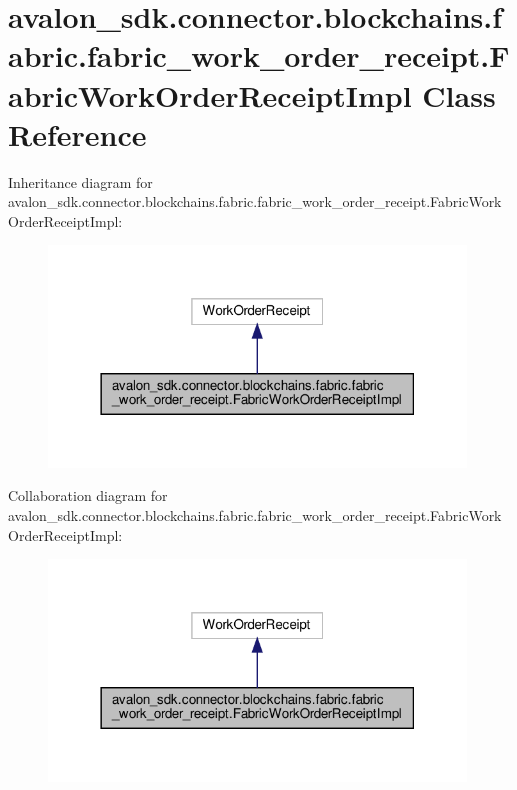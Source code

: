 \hypertarget{classavalon__sdk_1_1connector_1_1blockchains_1_1fabric_1_1fabric__work__order__receipt_1_1FabricWorkOrderReceiptImpl}{}\section{avalon\+\_\+sdk.\+connector.\+blockchains.\+fabric.\+fabric\+\_\+work\+\_\+order\+\_\+receipt.\+Fabric\+Work\+Order\+Receipt\+Impl Class Reference}
\label{classavalon__sdk_1_1connector_1_1blockchains_1_1fabric_1_1fabric__work__order__receipt_1_1FabricWorkOrderReceiptImpl}


Inheritance diagram for avalon\+\_\+sdk.\+connector.\+blockchains.\+fabric.\+fabric\+\_\+work\+\_\+order\+\_\+receipt.\+Fabric\+Work\+Order\+Receipt\+Impl\+:
\nopagebreak
\begin{figure}[H]
\begin{center}
\leavevmode
\includegraphics[width=314pt]{classavalon__sdk_1_1connector_1_1blockchains_1_1fabric_1_1fabric__work__order__receipt_1_1Fabric4ae3a09fa88125b899609c0d4382bf8a}
\end{center}
\end{figure}


Collaboration diagram for avalon\+\_\+sdk.\+connector.\+blockchains.\+fabric.\+fabric\+\_\+work\+\_\+order\+\_\+receipt.\+Fabric\+Work\+Order\+Receipt\+Impl\+:
\nopagebreak
\begin{figure}[H]
\begin{center}
\leavevmode
\includegraphics[width=314pt]{classavalon__sdk_1_1connector_1_1blockchains_1_1fabric_1_1fabric__work__order__receipt_1_1Fabric65481b1b1033b37995177fabad9dbe31}
\end{center}
\end{figure}
